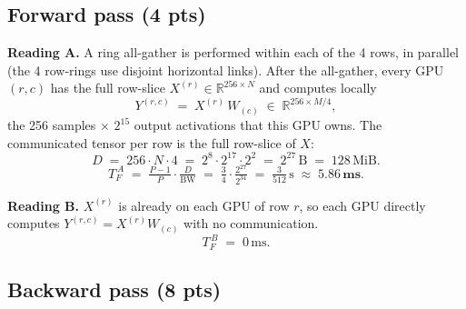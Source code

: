 \documentclass[11pt]{article}
\newcommand{\step}[1]{\noindent\textbf{#1}\quad}
\begin{document}
\subsection*{Forward pass (4 pts)}

\begin{stepbox}
\step{Reading A.}
A ring all-gather is performed within each of the 4 rows, in parallel
(the 4 row-rings use disjoint horizontal links).
After the all-gather, every GPU $(r,c)$ has the full row-slice
$X^{(r)} \in \mathbb{R}^{256\times N}$ and computes locally
\[
    Y^{(r,c)} \;=\; X^{(r)}\, W_{(c)} \;\in\;\mathbb{R}^{256\times M/4},
\]
the 256 samples $\times$ $2^{15}$ output activations that this GPU owns.
The communicated tensor per row is the full row-slice of $X$:
\[
    D \;=\; 256\cdot N\cdot 4 \;=\; 2^{8}\cdot 2^{17}\cdot 2^{2} \;=\; 2^{27}\,\text{B} \;=\; 128\,\text{MiB}.
\]
\[
    T_{F}^{\,A}
    \;=\; \tfrac{P-1}{P}\cdot\tfrac{D}{\mathrm{BW}}
    \;=\; \tfrac{3}{4}\cdot\tfrac{2^{27}}{2^{34}}
    \;=\; \tfrac{3}{512}\,\text{s}
    \;\approx\; \mathbf{5.86\,\text{ms}}.
\]

\medskip
\step{Reading B.}
$X^{(r)}$ is already on each GPU of row $r$, so each GPU directly computes
$Y^{(r,c)} = X^{(r)} W_{(c)}$ with no communication.
\[
    T_{F}^{\,B} \;=\; 0\,\text{ms}.
\]
\end{stepbox}

\subsection*{Backward pass (8 pts)}
\end{document}

